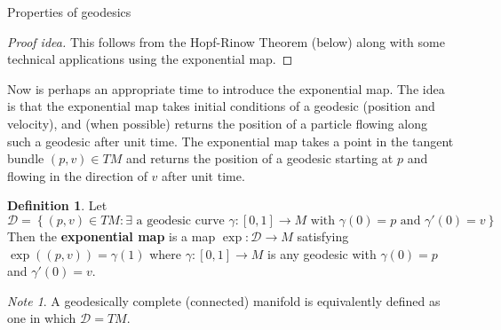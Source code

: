 \documentclass{article}
\newcommand{\fn}[3]{#1 \colon #2 \rightarrow #3}
\newcommand{\set}[1]{\left\{#1\right\}}
\theoremstyle{definition}
\newtheorem{definition}{Definition}[section]
\theoremstyle{remark}
\newtheorem{remark}{Note}[section]
\newtheorem{theorem}{Theorem}[section]
\begin{document}
\begin{section}{Properties of geodesics}
  \begin{proof}[Proof idea]
    This follows from the Hopf-Rinow Theorem (below) along with some technical
    applications using the exponential map.
  \end{proof}

  Now is perhaps an appropriate time to introduce the exponential map. The idea
  is that the exponential map takes initial conditions of a geodesic
  (position and velocity), and (when possible) returns the position of a particle
  flowing along such a geodesic after unit time.
  The exponential map takes a point in the tangent bundle
  $(p, v) \in TM$ and returns the position of a geodesic starting at $p$
  and flowing in the direction of $v$ after unit time.
  \begin{definition}
    Let \[
      \mathcal D = \set{ (p, v) \in TM :
        \exists
        \text{ a geodesic curve }
        \fn \gamma {[0, 1]} M
        \text{ with }
        \gamma(0) = p
        \text{ and }
        \gamma'(0) = v
      }
    \]
    Then the \textbf{exponential map} is a map $
      \fn {\exp} {\mathcal D} M
    $ satisfying $\exp((p, v)) = \gamma(1)$ where
    $\fn \gamma {[0, 1]} M$ is any geodesic with $\gamma(0) = p$ and
    $\gamma'(0) = v$.
  \end{definition}
  \begin{remark}
    A geodesically complete (connected) manifold is equivalently defined as one
    in which $\mathcal D = TM$.
  \end{remark}

\end{section}
\end{document}
